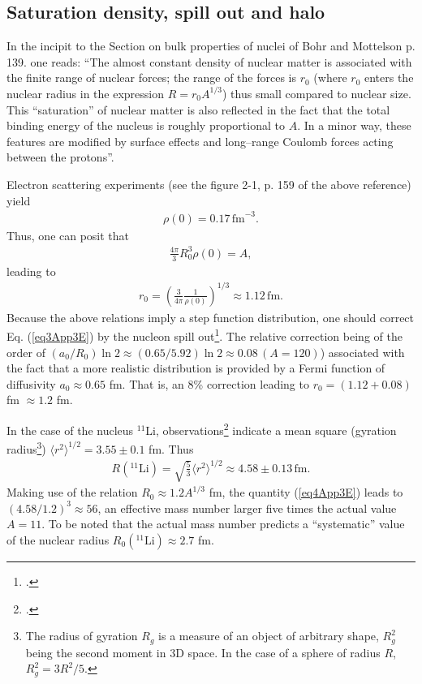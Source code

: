 \subsection{Saturation density, spill out and halo}\label{S4.10.1}
In the incipit to the Section on bulk properties of nuclei of Bohr and Mottelson \citep{Bohr:69} p. 139. one reads: ``The almost constant density of nuclear matter is associated with the finite range of nuclear forces; the range of the forces is $r_0$ (where $r_0$ enters the nuclear radius in the expression $R=r_0A^{1/3}$) thus small compared to nuclear size. This ``saturation'' of nuclear matter is also reflected in the fact that the total binding energy of the nucleus is roughly proportional to $A$. In a minor way, these features are modified by surface effects and long--range Coulomb forces acting between the protons''.



Electron scattering experiments (see the figure 2-1, p. 159 of the above reference) yield
\begin{align}
\rho(0)=0.17\,\text{fm}^{-3}.
\end{align}
Thus, one can posit that
\begin{align}
\frac{4\pi}{3}R_0^3\rho(0)=A,
\end{align}
leading to
\begin{align}\label{eq3App3E}
r_0=\left(\frac{3}{4\pi}\frac{1}{\rho(0)}\right)^{1/3}\approx 1.12\,\text{fm}.
\end{align}
Because the above relations imply a step function distribution, one should correct Eq. (\ref{eq3App3E}) by the nucleon spill out\footnote{\cite{Bertsch:05}.}. The relative correction being of the order of $(a_0/R_0)\ln 2\approx (0.65/5.92)\ln 2\approx 0.08\, (A=120)$) associated with the fact that a more realistic distribution is provided by a Fermi function of diffusivity $a_0\approx 0.65$ fm. That is, an 8\% correction leading to $r_0=(1.12+0.08)$ fm $\approx 1.2$ fm. 


In the case of the nucleus $^{11}$Li, observations\footnote{\cite{Kobayashi:89}.} indicate a mean square (gyration radius\footnote{The radius of gyration $R_g$ is a measure of an object of arbitrary shape, $R^2_g$ being the second moment in 3D space. In the case of a sphere of radius $R$, $R^2_g=3R^2/5$.}) $\langle r^2\rangle^{1/2}=3.55\pm 0.1$ fm. Thus
\begin{align}\label{eq4App3E}
R(^{11}\text{Li})=\sqrt{\frac{5}{3}}\langle r^2\rangle^{1/2}\approx 4.58\pm 0.13\,\text{fm}.
\end{align}
Making use of the relation $R_0\approx1.2 A^{1/3}$ fm, the quantity (\ref{eq4App3E}) leads to $(4.58/1.2)^3\approx56$, an effective mass number larger five times the actual value $A=11$. To be noted that the actual mass number predicts a ``systematic'' value of the nuclear radius $R_0(^{11}\text{Li})\approx 2.7$ fm.


